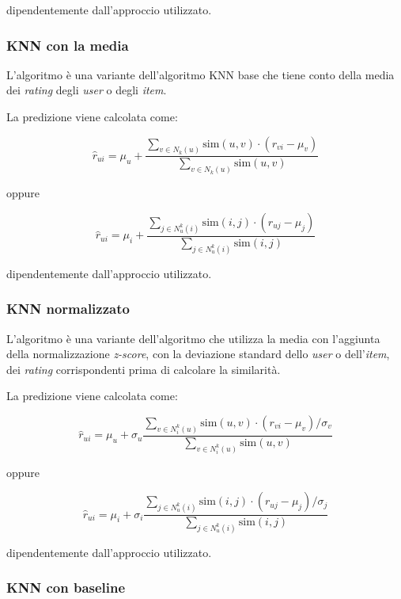 dipendentemente dall'approccio utilizzato.

\subsubsection{KNN con la media}
\label{algoritmo-knn-con-la-media}

L'algoritmo è una variante dell'algoritmo KNN base che tiene conto della media dei \textit{rating} degli \textit{user} o degli \textit{item}.

La predizione viene calcolata come:

\[
\hat{r}_{ui} = \mu_u + \frac{\sum\limits_{v \in N_k(u)} \text{sim}(u, v) \cdot (r_{vi} - \mu_v)}{\sum\limits_{v \in N_k(u)} \text{sim}(u, v)}
\]

oppure

\[
\hat{r}_{ui} = \mu_i + \frac{\sum\limits_{j \in N^k_u(i)} \text{sim}(i, j) \cdot (r_{uj} - \mu_j)}{\sum\limits_{j \in N^k_u(i)} \text{sim}(i, j)}
\]

dipendentemente dall'approccio utilizzato.

\subsubsection{KNN normalizzato}
\label{algoritmo-knn-normalizzato}

L'algoritmo è una variante dell'algoritmo che utilizza la media con l'aggiunta della normalizzazione \textit{z-score}, con la deviazione standard dello \textit{user} o dell'\textit{item}, dei \textit{rating} corrispondenti prima di calcolare la similarità.

La predizione viene calcolata come:

\[
\hat{r}_{ui} = \mu_u + \sigma_u \frac{\sum\limits_{v \in N^k_i(u)} \text{sim}(u, v) \cdot (r_{vi} - \mu_v) / \sigma_v}{\sum\limits_{v \in N^k_i(u)} \text{sim}(u, v)}
\]

oppure

\[
\hat{r}_{ui} = \mu_i + \sigma_i \frac{\sum\limits_{j \in N^k_u(i)} \text{sim}(i, j) \cdot (r_{uj} - \mu_j) / \sigma_j}{\sum\limits_{j \in N^k_u(i)} \text{sim}(i, j)}
\]

dipendentemente dall'approccio utilizzato.

\subsubsection{KNN con baseline}\label{knn_baseline}
\label{knn-con-baseline}

